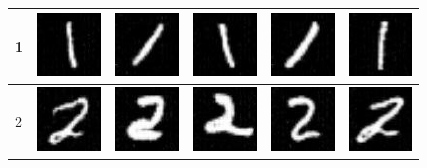 \begin{table}[H]
\begin{tabular}{|llllll|}
1 & \includegraphics[width=1.69cm, height=1.69cm]{Files/MNIST/0-1.png}  &\includegraphics[width=1.69cm, height=1.69cm]{Files/MNIST/1-3.png}   & \includegraphics[width=1.69cm, height=1.69cm]{Files/MNIST/2-5.png}  & \includegraphics[width=1.69cm, height=1.69cm]{Files/MNIST/5-1.png}  & \includegraphics[width=1.69cm, height=1.69cm]{Files/MNIST/7-5.png} \\ \hline

2 & \includegraphics[width=1.69cm, height=1.69cm]{Files/MNIST/0-2.png}  &\includegraphics[width=1.69cm, height=1.69cm]{Files/MNIST/1-4.png}   & \includegraphics[width=1.69cm, height=1.69cm]{Files/MNIST/2-6.png}  & \includegraphics[width=1.69cm, height=1.69cm]{Files/MNIST/5-2.png}  & \includegraphics[width=1.69cm, height=1.69cm]{Files/MNIST/6-4.png} \\ \hline


\end{tabular}
\end{table}
